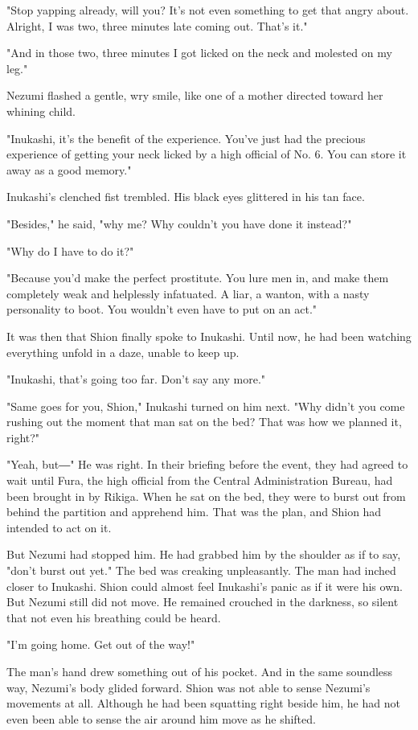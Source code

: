 "Stop yapping already, will you? It's not even something to get that
angry about. Alright, I was two, three minutes late coming out. That's
it."

"And in those two, three minutes I got licked on the neck and molested
on my leg."

Nezumi flashed a gentle, wry smile, like one of a mother directed toward
her whining child.

"Inukashi, it's the benefit of the experience. You've just had the
precious experience of getting your neck licked by a high official of
No. 6. You can store it away as a good memory."

Inukashi's clenched fist trembled. His black eyes glittered in his tan
face.

"Besides," he said, "why me? Why couldn't you have done it instead?"

"Why do I have to do it?"

"Because you'd make the perfect prostitute. You lure men in, and make
them completely weak and helplessly infatuated. A liar, a wanton, with a
nasty personality to boot. You wouldn't even have to put on an act."

It was then that Shion finally spoke to Inukashi. Until now, he had been
watching everything unfold in a daze, unable to keep up.

"Inukashi, that's going too far. Don't say any more."

"Same goes for you, Shion," Inukashi turned on him next. "Why didn't you
come rushing out the moment that man sat on the bed? That was how we
planned it, right?"

"Yeah, but―" He was right. In their briefing before the event, they had
agreed to wait until Fura, the high official from the Central
Administration Bureau, had been brought in by Rikiga. When he sat on the
bed, they were to burst out from behind the partition and apprehend him.
That was the plan, and Shion had intended to act on it.

But Nezumi had stopped him. He had grabbed him by the shoulder as if to
say, "don't burst out yet." The bed was creaking unpleasantly. The man
had inched closer to Inukashi. Shion could almost feel Inukashi's panic
as if it were his own. But Nezumi still did not move. He remained
crouched in the darkness, so silent that not even his breathing could be
heard.

"I'm going home. Get out of the way!"

The man's hand drew something out of his pocket. And in the same
soundless way, Nezumi's body glided forward. Shion was not able to sense
Nezumi's movements at all. Although he had been squatting right beside
him, he had not even been able to sense the air around him move as he
shifted.

